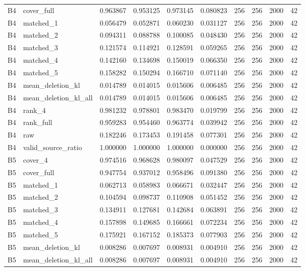 \begin{tabular}{llrrrrrrrr}
B4 & cover_full & 0.963867 & 0.953125 & 0.973145 & 0.080823 & 256 & 256 & 2000 & 42 \\
B4 & matched_1 & 0.056479 & 0.052871 & 0.060230 & 0.031127 & 256 & 256 & 2000 & 42 \\
B4 & matched_2 & 0.094311 & 0.088788 & 0.100085 & 0.048430 & 256 & 256 & 2000 & 42 \\
B4 & matched_3 & 0.121574 & 0.114921 & 0.128591 & 0.059265 & 256 & 256 & 2000 & 42 \\
B4 & matched_4 & 0.142160 & 0.134698 & 0.150019 & 0.066350 & 256 & 256 & 2000 & 42 \\
B4 & matched_5 & 0.158282 & 0.150294 & 0.166710 & 0.071140 & 256 & 256 & 2000 & 42 \\
B4 & mean_deletion_kl & 0.014789 & 0.014015 & 0.015606 & 0.006485 & 256 & 256 & 2000 & 42 \\
B4 & mean_deletion_kl_all & 0.014789 & 0.014015 & 0.015606 & 0.006485 & 256 & 256 & 2000 & 42 \\
B4 & rank_4 & 0.981232 & 0.978801 & 0.983470 & 0.019799 & 256 & 256 & 2000 & 42 \\
B4 & rank_full & 0.959283 & 0.954460 & 0.963774 & 0.039942 & 256 & 256 & 2000 & 42 \\
B4 & raw & 0.182246 & 0.173453 & 0.191458 & 0.077301 & 256 & 256 & 2000 & 42 \\
B4 & valid_source_ratio & 1.000000 & 1.000000 & 1.000000 & 0.000000 & 256 & 256 & 2000 & 42 \\
B5 & cover_4 & 0.974516 & 0.968628 & 0.980097 & 0.047529 & 256 & 256 & 2000 & 42 \\
B5 & cover_full & 0.947754 & 0.937012 & 0.958496 & 0.091380 & 256 & 256 & 2000 & 42 \\
B5 & matched_1 & 0.062713 & 0.058983 & 0.066671 & 0.032447 & 256 & 256 & 2000 & 42 \\
B5 & matched_2 & 0.104594 & 0.098737 & 0.110908 & 0.051452 & 256 & 256 & 2000 & 42 \\
B5 & matched_3 & 0.134911 & 0.127681 & 0.142684 & 0.063891 & 256 & 256 & 2000 & 42 \\
B5 & matched_4 & 0.157898 & 0.149685 & 0.166661 & 0.072234 & 256 & 256 & 2000 & 42 \\
B5 & matched_5 & 0.175921 & 0.167152 & 0.185373 & 0.077903 & 256 & 256 & 2000 & 42 \\
B5 & mean_deletion_kl & 0.008286 & 0.007697 & 0.008931 & 0.004910 & 256 & 256 & 2000 & 42 \\
B5 & mean_deletion_kl_all & 0.008286 & 0.007697 & 0.008931 & 0.004910 & 256 & 256 & 2000 & 42 \\

\end{tabular}
